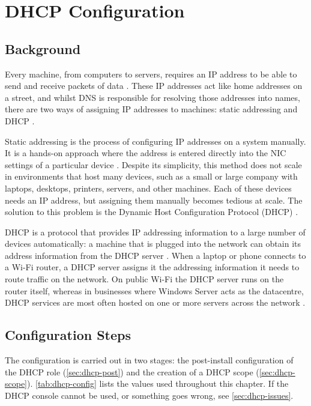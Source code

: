 \chapter{DHCP Configuration}
\label{chap:dhcp}

\section{Background}
\label{sec:dhcp-background}
Every machine, from computers to servers, requires an IP address to be able to send and receive packets of data \cite{krause2019}. These IP addresses act like home addresses on a street, and whilst DNS is responsible for resolving those addresses into names, there are two ways of assigning IP addresses to machines: static addressing and DHCP \cite{krause2019}.

Static addressing is the process of configuring IP addresses on a system manually. It is a hands-on approach where the address is entered directly into the NIC settings of a particular device \cite{krause2019}. Despite its simplicity, this method does not scale in environments that host many devices, such as a small or large company with laptops, desktops, printers, servers, and other machines. Each of these devices needs an IP address, but assigning them manually becomes tedious at scale. The solution to this problem is the Dynamic Host Configuration Protocol (DHCP) \cite{krause2019}.

DHCP is a protocol that provides IP addressing information to a large number of devices automatically: a machine that is plugged into the network can obtain its address information from the DHCP server \cite{krause2019}. When a laptop or phone connects to a Wi-Fi router, a DHCP server assigns it the addressing information it needs to route traffic on the network. On public Wi-Fi the DHCP server runs on the router itself, whereas in businesses where Windows Server acts as the datacentre, DHCP services are most often hosted on one or more servers across the network \cite{krause2019}.

\section{Configuration Steps}
\label{sec:dhcp-steps}
The configuration is carried out in two stages: the post-install configuration of the DHCP role (\autoref{sec:dhcp-post}) and the creation of a DHCP scope (\autoref{sec:dhcp-scope}). \autoref{tab:dhcp-config} lists the values used throughout this chapter. If the DHCP console cannot be used, or something goes wrong, see \autoref{sec:dhcp-issues}.


